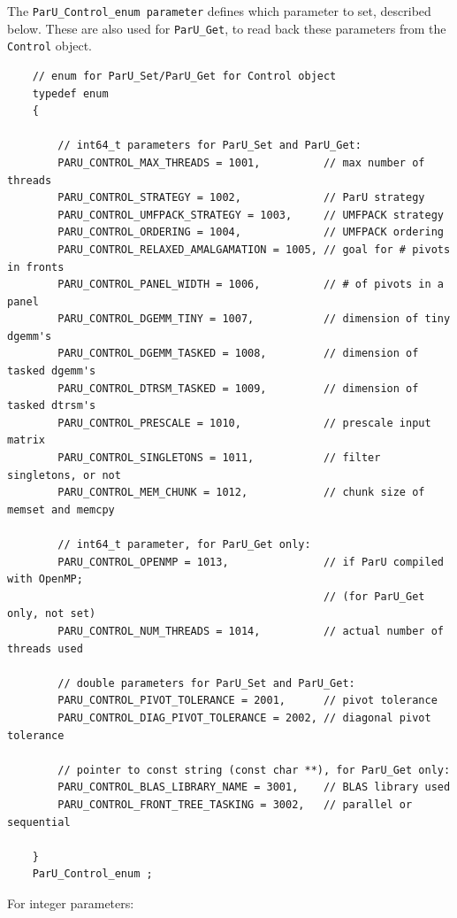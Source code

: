 \documentclass[12pt]{article}
\begin{document}
The \verb'ParU_Control_enum parameter' defines which parameter to set,
described below.  These are also used for \verb'ParU_Get', to read back these
parameters from the \verb'Control' object.

    {\footnotesize
    \begin{verbatim}
    // enum for ParU_Set/ParU_Get for Control object
    typedef enum
    {

        // int64_t parameters for ParU_Set and ParU_Get:
        PARU_CONTROL_MAX_THREADS = 1001,          // max number of threads
        PARU_CONTROL_STRATEGY = 1002,             // ParU strategy
        PARU_CONTROL_UMFPACK_STRATEGY = 1003,     // UMFPACK strategy
        PARU_CONTROL_ORDERING = 1004,             // UMFPACK ordering
        PARU_CONTROL_RELAXED_AMALGAMATION = 1005, // goal for # pivots in fronts
        PARU_CONTROL_PANEL_WIDTH = 1006,          // # of pivots in a panel
        PARU_CONTROL_DGEMM_TINY = 1007,           // dimension of tiny dgemm's
        PARU_CONTROL_DGEMM_TASKED = 1008,         // dimension of tasked dgemm's
        PARU_CONTROL_DTRSM_TASKED = 1009,         // dimension of tasked dtrsm's
        PARU_CONTROL_PRESCALE = 1010,             // prescale input matrix
        PARU_CONTROL_SINGLETONS = 1011,           // filter singletons, or not
        PARU_CONTROL_MEM_CHUNK = 1012,            // chunk size of memset and memcpy

        // int64_t parameter, for ParU_Get only:
        PARU_CONTROL_OPENMP = 1013,               // if ParU compiled with OpenMP;
                                                  // (for ParU_Get only, not set)
        PARU_CONTROL_NUM_THREADS = 1014,          // actual number of threads used

        // double parameters for ParU_Set and ParU_Get:
        PARU_CONTROL_PIVOT_TOLERANCE = 2001,      // pivot tolerance
        PARU_CONTROL_DIAG_PIVOT_TOLERANCE = 2002, // diagonal pivot tolerance

        // pointer to const string (const char **), for ParU_Get only:
        PARU_CONTROL_BLAS_LIBRARY_NAME = 3001,    // BLAS library used
        PARU_CONTROL_FRONT_TREE_TASKING = 3002,   // parallel or sequential

    }
    ParU_Control_enum ; \end{verbatim}}

    For integer parameters:
\end{document}
